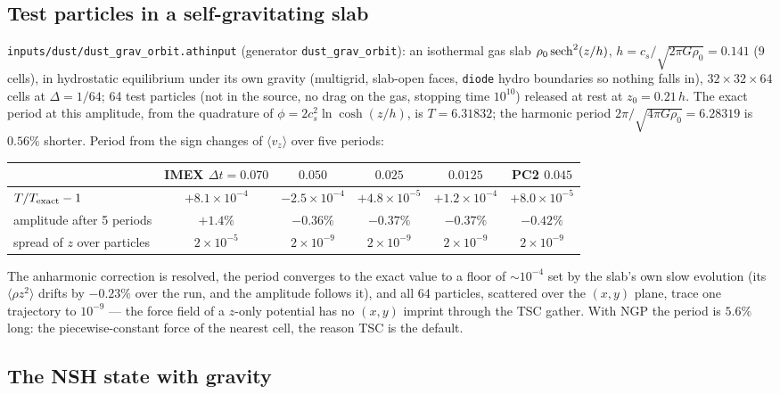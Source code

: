 \documentclass[11pt]{article}
\newcommand{\code}[1]{\texttt{#1}}
\newcommand{\file}[1]{\texttt{#1}}
\begin{document}
\subsection{Test particles in a self-gravitating slab}

\file{inputs/dust/dust\_grav\_orbit.athinput} (generator \code{dust\_grav\_orbit}): an
isothermal gas slab $\rho_0\,{\rm sech}^2(z/h)$, $h = c_s/\sqrt{2\pi G\rho_0} = 0.141$
($9$ cells), in hydrostatic equilibrium under its own gravity (multigrid, slab-open
faces, \code{diode} hydro boundaries so nothing falls in), $32\times32\times64$ cells at
$\Delta = 1/64$; 64 test particles (not in the source, no drag on the gas, stopping time
$10^{10}$) released at rest at $z_0 = 0.21\,h$. The exact period at this amplitude, from
the quadrature of $\phi = 2c_s^2\ln\cosh(z/h)$, is $T = 6.31832$; the harmonic period
$2\pi/\sqrt{4\pi G\rho_0} = 6.28319$ is $0.56\%$ shorter. Period from the sign changes
of $\langle v_z\rangle$ over five periods:

\begin{center}
\small
\begin{tabular}{@{}lccccc@{}}
\toprule
 & IMEX $\Delta t = 0.070$ & $0.050$ & $0.025$ & $0.0125$ & PC2 $0.045$ \\
\midrule
$T/T_{\rm exact} - 1$ & $+8.1\times10^{-4}$ & $-2.5\times10^{-4}$ & $+4.8\times10^{-5}$ & $+1.2\times10^{-4}$ & $+8.0\times10^{-5}$ \\
amplitude after 5 periods & $+1.4\%$ & $-0.36\%$ & $-0.37\%$ & $-0.37\%$ & $-0.42\%$ \\
spread of $z$ over particles & $2\times10^{-5}$ & $2\times10^{-9}$ & $2\times10^{-9}$ & $2\times10^{-9}$ & $2\times10^{-9}$ \\
\bottomrule
\end{tabular}
\end{center}

The anharmonic correction is resolved, the period converges to the exact value to a
floor of $\sim10^{-4}$ set by the slab's own slow evolution (its $\langle\rho z^2\rangle$
drifts by $-0.23\%$ over the run, and the amplitude follows it), and all 64 particles,
scattered over the $(x,y)$ plane, trace one trajectory to $10^{-9}$ --- the force field
of a $z$-only potential has no $(x,y)$ imprint through the TSC gather. With NGP the
period is $5.6\%$ long: the piecewise-constant force of the nearest cell, the reason TSC
is the default.

\subsection{The NSH state with gravity}
\end{document}
